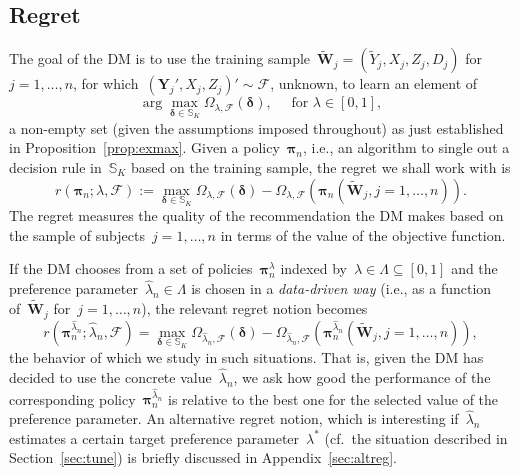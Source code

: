 \documentclass[11pt, a4paper]{article}
\theoremstyle{definition}
\begin{document}
\subsection{Regret}\label{sec:reg}

The goal of the DM is to use the training sample~$\tilde{\bm{W}}_j = (\tilde{Y}_{j}, X_j, Z_j, D_j)$ for~$j = 1, \hdots, n$, for which~$(\bm{Y}_j', X_j, Z_j)' \sim \mathcal{F}$, unknown, to learn an element of
%
\begin{equation*}
\arg\max_{\bm{\delta} \in \mathbb{S}_K} \Omega_{\lambda, \mathcal{F}}(\bm{\delta}), \quad \text{ for } \lambda \in [0, 1],
\end{equation*}
%
a non-empty set (given the assumptions imposed throughout) as just established in Proposition~\ref{prop:exmax}. Given a policy~$\bm{\pi}_n$, i.e., an algorithm to single out a decision rule in~$\mathbb{S}_K$ based on the training sample, the regret we shall work with is
%
\begin{equation}\label{eqn:regret}
r(\bm{\pi}_n; \lambda, \mathcal{F}) := \max_{\bm{\delta} \in \mathbb{S}_K} \Omega_{\lambda, \mathcal{F}}(\bm{\delta}) - \Omega_{\lambda, \mathcal{F}} \left(\bm{\pi}_n(\tilde{\bm{W}}_j, j = 1, \hdots, n)\right).
\end{equation}
%
The regret measures the quality of the recommendation the DM makes based on the sample of subjects~$j = 1, \hdots, n$ in terms of the value of the objective function. 

If the DM chooses from a set of policies~$\bm{\pi}_n^{\lambda}$ indexed by~$\lambda \in \Lambda \subseteq [0, 1]$ and the preference parameter~$  \hat{\lambda}_n \in \Lambda$ is chosen in a \emph{data-driven way} (i.e., as a function of~$\tilde{\bm{W}}_j$ for~$j = 1, \hdots, n$), the relevant regret notion becomes
%
\begin{equation}
r(\bm{\pi}^{  \hat{\lambda}_n}_n;   \hat{\lambda}_n, \mathcal{F}) = \max_{\bm{\delta} \in \mathbb{S}_K} \Omega_{\hat{\lambda}_n, \mathcal{F}}(\bm{\delta}) - \Omega_{\hat{\lambda}_n, \mathcal{F}} \left(\bm{\pi}^{\hat{\lambda}_n}_n(\tilde{\bm{W}}_j, j = 1, \hdots, n)\right),
\end{equation}
%
the behavior of which we study in such situations. That is, given the DM has decided to use the concrete value~$\hat{\lambda}_n$, we ask how good the performance of the corresponding policy~$\bm{\pi}^{  \hat{\lambda}_n}_n$ is relative to the best one for the selected value of the preference parameter. An alternative regret notion, which is interesting if~$\hat{\lambda}_n$ estimates a certain target preference parameter~$\lambda^*$ (cf.~the situation described in Section~\ref{sec:tune}) is briefly discussed in Appendix~\ref{sec:altreg}.
\end{document}
